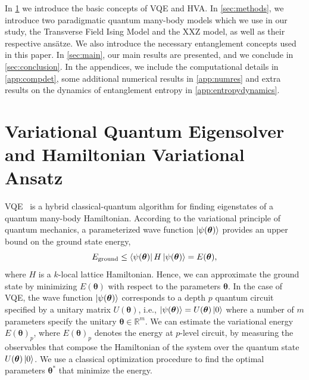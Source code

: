 \documentclass[
 aps,
 pra,
 showpacs,
 showkeys,
 superscriptaddress,
 reprint,%
twocolumn,
]{revtex4-1}
\begin{document}
In \cref{sec:vqehva} we introduce the basic concepts of VQE and HVA. In \cref{sec:methods}, we introduce two paradigmatic quantum many-body models which we use in our study, the Transverse Field Ising Model and the XXZ model, as well as their respective ans\"atze. We also introduce the necessary entanglement concepts used in this paper. In \cref{sec:main}, our main results are presented, and we conclude in \cref{sec:conclusion}. In the appendices, we include the computational details in \cref{app:compdet}, some additional numerical results in \cref{app:numres} and extra results on the dynamics of entanglement entropy in \cref{app:entropydynamics}.



\section{Variational Quantum Eigensolver and Hamiltonian Variational Ansatz}\label{sec:vqehva}

VQE~\cite{Peruzzo2014} is a hybrid classical-quantum algorithm for finding eigenstates of a quantum many-body Hamiltonian. According to the variational principle of quantum mechanics, a parameterized wave function $\ket{\psi(\bm{\theta})}$ provides an upper bound on the ground state energy, 
\begin{equation}
    E_{\text{ground}} \leq \bra{\psi(\bm{\theta})} H \ket{\psi(\bm{\theta})} = E(\bm{\theta}), \label{eq:cost}
\end{equation}
where $H$ is a $k$-local lattice Hamiltonian. Hence, we can approximate the ground state by minimizing $E(\bm{\theta})$ with respect to the parameters $\bm{\theta}$. In the case of VQE, the wave function $\ket{\psi(\bm{\theta})}$ corresponds to a depth $p$ quantum circuit specified by a unitary matrix $U(\bm{\theta})$, i.e., $\ket{\psi(\bm{\theta})} = U(\bm{\theta})\ket{0}$ where a number of $m$ parameters specify the unitary $\bm{\theta}\in \mathbb{R}^m$. We can estimate the variational energy $E(\bm{\theta})_p$, where $E(\bm{\theta})_{p}$ denotes the energy at $p$-level circuit, by measuring the observables that compose the Hamiltonian of the system over the quantum state $U(\bm{\theta})\ket{0}$. We use a classical optimization procedure to find the optimal parameters $\bm{\theta}^*$ that minimize the energy. 
\end{document}

